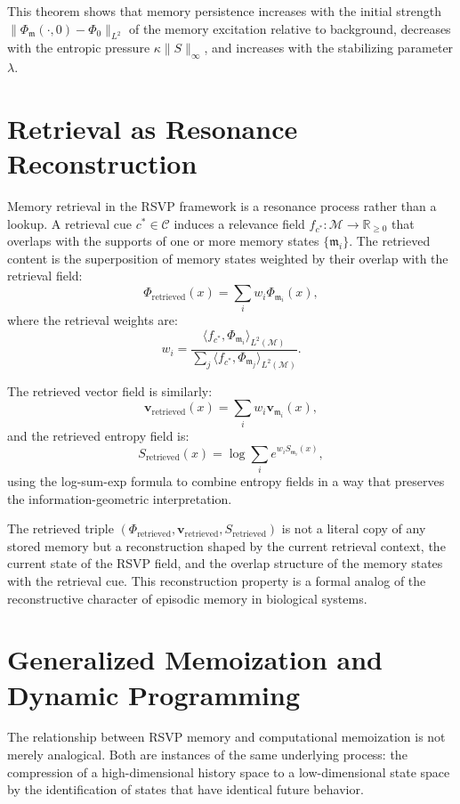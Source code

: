 \documentclass[12pt, a4paper, openany]{book}
\theoremstyle{plain}
\theoremstyle{definition}
\theoremstyle{remark}
\newcommand{\vvec}{\mathbf{v}}
\newcommand{\Sfield}{S}
\begin{document}
This theorem shows that memory persistence increases with the initial strength $\|\Phi_\mathfrak{m}(\cdot, 0) - \Phi_0\|_{L^2}$ of the memory excitation relative to background, decreases with the entropic pressure $\kappa \|\Sfield\|_\infty$, and increases with the stabilizing parameter $\lambda$.

\section{Retrieval as Resonance Reconstruction}

Memory retrieval in the RSVP framework is a resonance process rather than a lookup. A retrieval cue $c^* \in \mathcal{C}$ induces a relevance field $f_{c^*}: \mathcal{M} \to \mathbb{R}_{\geq 0}$ that overlaps with the supports of one or more memory states $\{\mathfrak{m}_i\}$. The retrieved content is the superposition of memory states weighted by their overlap with the retrieval field:
\[
\Phi_{\mathrm{retrieved}}(x) = \sum_i w_i \Phi_{\mathfrak{m}_i}(x),
\]
where the retrieval weights are:
\[
w_i = \frac{\langle f_{c^*}, \Phi_{\mathfrak{m}_i} \rangle_{L^2(\mathcal{M})}}{\sum_j \langle f_{c^*}, \Phi_{\mathfrak{m}_j} \rangle_{L^2(\mathcal{M})}}.
\]

The retrieved vector field is similarly:
\[
\vvec_{\mathrm{retrieved}}(x) = \sum_i w_i \vvec_{\mathfrak{m}_i}(x),
\]
and the retrieved entropy field is:
\[
\Sfield_{\mathrm{retrieved}}(x) = \log \sum_i e^{w_i \Sfield_{\mathfrak{m}_i}(x)},
\]
using the log-sum-exp formula to combine entropy fields in a way that preserves the information-geometric interpretation.

The retrieved triple $(\Phi_{\mathrm{retrieved}}, \vvec_{\mathrm{retrieved}}, \Sfield_{\mathrm{retrieved}})$ is not a literal copy of any stored memory but a reconstruction shaped by the current retrieval context, the current state of the RSVP field, and the overlap structure of the memory states with the retrieval cue. This reconstruction property is a formal analog of the reconstructive character of episodic memory in biological systems.

\section{Generalized Memoization and Dynamic Programming}

The relationship between RSVP memory and computational memoization is not merely analogical. Both are instances of the same underlying process: the compression of a high-dimensional history space to a low-dimensional state space by the identification of states that have identical future behavior.
\end{document}
